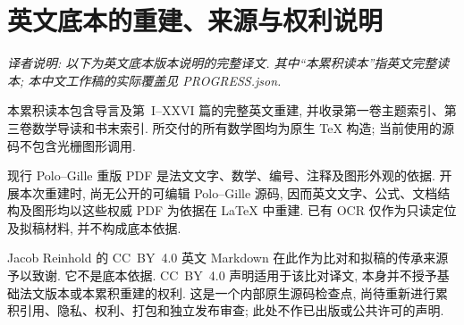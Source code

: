 \chapter*{英文底本的重建、来源与权利说明}
\noindent\textit{译者说明: 以下为英文底本版本说明的完整译文. 其中“本累积读本”指英文完整读本; 本中文工作稿的实际覆盖见 PROGRESS.json.}
\medskip

本累积读本包含导言及第~I--XXVI 篇的完整英文重建, 并收录第一卷主题索引、第三卷数学导读和书末索引. 所交付的所有数学图均为原生 \TeX{} 构造; 当前使用的源码不包含光栅图形调用.

现行 Polo--Gille 重版 PDF 是法文文字、数学、编号、注释及图形外观的依据. 开展本次重建时, 尚无公开的可编辑 Polo--Gille 源码, 因而英文文字、公式、文档结构及图形均以这些权威 PDF 为依据在 \LaTeX{} 中重建. 已有 OCR 仅作为只读定位及拟稿材料, 并不构成底本依据.

Jacob Reinhold 的 CC~BY~4.0 英文 Markdown 在此作为比对和拟稿的传承来源予以致谢. 它不是底本依据. CC~BY~4.0 声明适用于该比对译文, 本身并不授予基础法文版本或本累积重建的权利. 这是一个内部原生源码检查点, 尚待重新进行累积引用、隐私、权利、打包和独立发布审查; 此处不作已出版或公共许可的声明.
